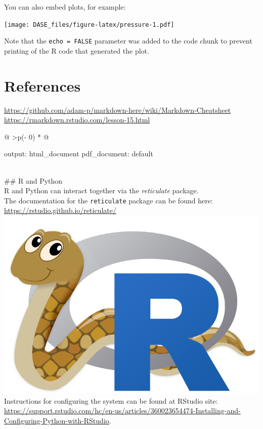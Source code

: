 \documentclass[
]{book}
\begin{document}
You can also embed plots, for example:

\texttt{[image: DASE\_files/figure-latex/pressure-1.pdf]}

Note that the \texttt{echo\ =\ FALSE} parameter was added to the code chunk to prevent printing of the R code that generated the plot.

\hypertarget{references}{%
\section{References}\label{references}}

\url{https://github.com/adam-p/markdown-here/wiki/Markdown-Cheatsheet}
\url{https://rmarkdown.rstudio.com/lesson-15.html}

\begin{longtable}[]{@{}
  >{\raggedleft\arraybackslash}p{(\columnwidth - 0\tabcolsep) * }@{}}
\toprule
\begin{minipage}[b]{\linewidth}\raggedleft
output: html\_document
pdf\_document: default
\end{minipage} \\
\midrule
\endhead
\#\# R and Python \\
R and Python can interact together via the \emph{reticulate} package. \\
The documentation for the \texttt{reticulate} package can be found here:
\url{https://rstudio.github.io/reticulate/} \\
\includegraphics{./figures/reticulated_python.png} \\
Instructions for configuring the system can be found at RStudio site: \url{https://support.rstudio.com/hc/en-us/articles/360023654474-Installing-and-Configuring-Python-with-RStudio}. \\

\end{longtable}
\end{document}
